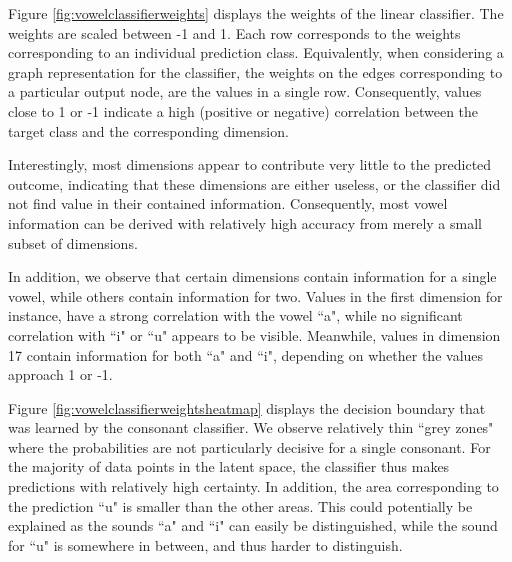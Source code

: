 		Figure \ref{fig:vowelclassifierweights} displays the weights of the linear classifier. The weights are scaled between -1 and 1. Each row corresponds to the weights corresponding to an individual prediction class. Equivalently, when considering a graph representation for the classifier, the weights on the edges corresponding to a particular output node, are the values in a single row. Consequently, values close to 1 or -1 indicate a high (positive or negative) correlation between the target class and the corresponding dimension. 
		
		Interestingly, most dimensions appear to contribute very little to the predicted outcome, indicating that these dimensions are either useless, or the classifier did not find value in their contained information. Consequently, most vowel information can be derived with relatively high accuracy from merely a small subset of dimensions. 
		
		In addition, we observe that certain dimensions contain information for a single vowel, while others contain information for two. Values in the first dimension for instance, have a strong correlation with the vowel ``a", while no significant correlation with ``i" or ``u" appears to be visible. Meanwhile, values in dimension 17 contain information for both ``a" and ``i", depending on whether the values approach 1 or -1.
		
		Figure \ref{fig:vowelclassifierweightsheatmap} displays the decision boundary that was learned by the consonant classifier. We observe relatively thin ``grey zones" where the probabilities are not particularly decisive for a single consonant. For the majority of data points in the latent space, the classifier thus makes predictions with relatively high certainty. In addition, the area corresponding to the prediction ``u" is smaller than the other areas. This could potentially be explained as the sounds ``a" and ``i" can easily be distinguished, while the sound for ``u" is somewhere in between, and thus harder to distinguish.
		
		
		
		
		

